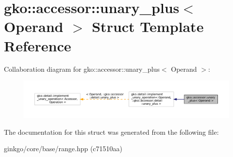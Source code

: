 \hypertarget{structgko_1_1accessor_1_1unary__plus}{}\section{gko\+:\+:accessor\+:\+:unary\+\_\+plus$<$ Operand $>$ Struct Template Reference}
\label{structgko_1_1accessor_1_1unary__plus}


Collaboration diagram for gko\+:\+:accessor\+:\+:unary\+\_\+plus$<$ Operand $>$\+:
\nopagebreak
\begin{figure}[H]
\begin{center}
\leavevmode
\includegraphics[width=350pt]{structgko_1_1accessor_1_1unary__plus__coll__graph}
\end{center}
\end{figure}


The documentation for this struct was generated from the following file\+:\begin{DoxyCompactItemize}
\item 
ginkgo/core/base/range.\+hpp (c71510aa)\end{DoxyCompactItemize}
